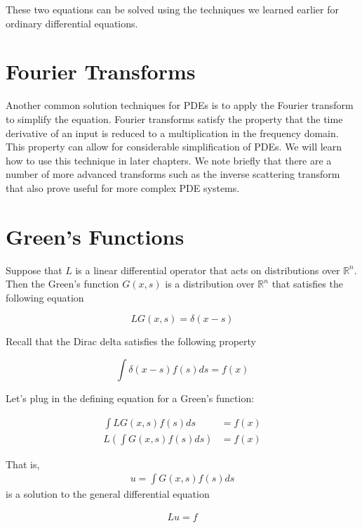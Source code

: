 \documentclass[book.tex]{subfiles}
\begin{document}
These two equations can be solved using the techniques we learned earlier for ordinary differential equations.

\section{Fourier Transforms}

Another common solution techniques for PDEs is to apply the Fourier transform to simplify the equation. Fourier transforms satisfy the property that the time derivative of an input is reduced to a multiplication in the frequency domain. This property can allow for considerable simplification of PDEs. We will learn how to use this technique in later chapters. We note briefly that there are a number of more advanced transforms such as the inverse scattering transform that also prove useful for more complex PDE systems.


\section{Green's Functions}

Suppose that $L$ is a linear differential operator that acts on distributions over $\mathbb{R}^n$. Then the Green's function $G(x, s)$ is a distribution over $\mathbb{R}^n$ that satisfies the following equation

\begin{equation}
    L G(x, s) = \delta(x -s)
\end{equation}

Recall that the Dirac delta satisfies the following property

\begin{equation}
    \int \delta(x - s) f(s) ds = f(x)
\end{equation} 

Let's plug in the defining equation for a Green's function:

\begin{align}
    \int L G(x, s) f(s) ds &= f(x) \\
    L \left ( \int G(x, s) f(s) ds \right ) &= f(x)
\end{align}

That is, 
\begin{align}
u = \int G(x, s)f(s) ds
\end{align} is a solution to the general differential equation

\begin{align} 
L u = f 
\end{align}
\end{document}
